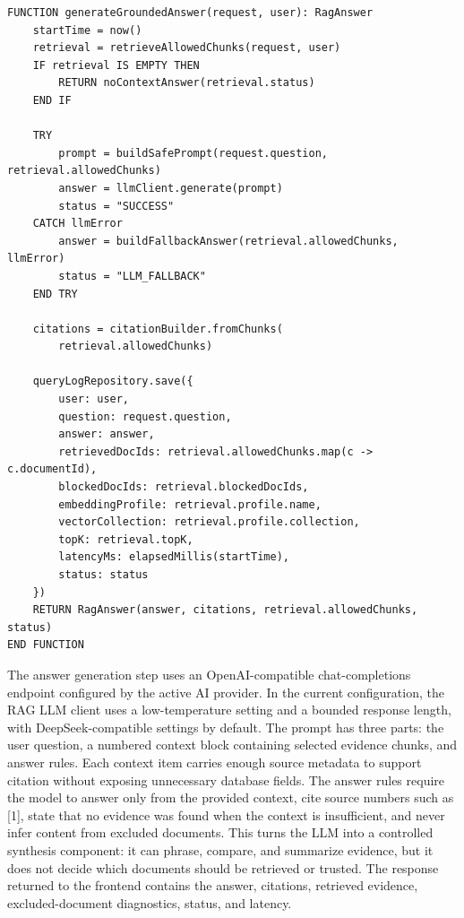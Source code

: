 \begin{table}[H]
\centering
\caption{Pseudocode --- generateGroundedAnswer() Citation and Audit Workflow}
\label{tab:pseudocode-rag-generate}
\vspace{2mm}

\begin{lstlisting}
FUNCTION generateGroundedAnswer(request, user): RagAnswer
    startTime = now()
    retrieval = retrieveAllowedChunks(request, user)
    IF retrieval IS EMPTY THEN
        RETURN noContextAnswer(retrieval.status)
    END IF

    TRY
        prompt = buildSafePrompt(request.question, retrieval.allowedChunks)
        answer = llmClient.generate(prompt)
        status = "SUCCESS"
    CATCH llmError
        answer = buildFallbackAnswer(retrieval.allowedChunks, llmError)
        status = "LLM_FALLBACK"
    END TRY

    citations = citationBuilder.fromChunks(
        retrieval.allowedChunks)

    queryLogRepository.save({
        user: user,
        question: request.question,
        answer: answer,
        retrievedDocIds: retrieval.allowedChunks.map(c -> c.documentId),
        blockedDocIds: retrieval.blockedDocIds,
        embeddingProfile: retrieval.profile.name,
        vectorCollection: retrieval.profile.collection,
        topK: retrieval.topK,
        latencyMs: elapsedMillis(startTime),
        status: status
    })
    RETURN RagAnswer(answer, citations, retrieval.allowedChunks, status)
END FUNCTION
\end{lstlisting}
\end{table}

The answer generation step uses an OpenAI-compatible chat-completions endpoint configured by the active AI provider. In the current configuration, the RAG LLM client uses a low-temperature setting and a bounded response length, with DeepSeek-compatible settings by default. The prompt has three parts: the user question, a numbered context block containing selected evidence chunks, and answer rules. Each context item carries enough source metadata to support citation without exposing unnecessary database fields. The answer rules require the model to answer only from the provided context, cite source numbers such as [1], state that no evidence was found when the context is insufficient, and never infer content from excluded documents. This turns the LLM into a controlled synthesis component: it can phrase, compare, and summarize evidence, but it does not decide which documents should be retrieved or trusted. The response returned to the frontend contains the answer, citations, retrieved evidence, excluded-document diagnostics, status, and latency.

